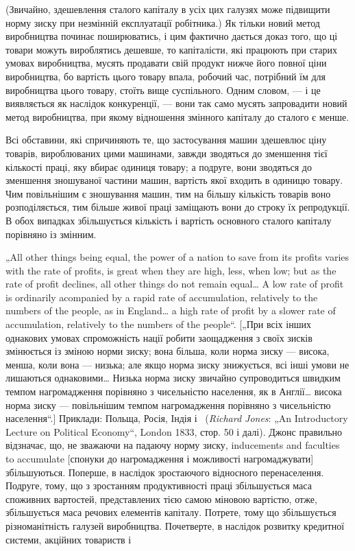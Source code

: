 \parcont{}  %
(Звичайно, здешевлення сталого капіталу в усіх цих галузях
може підвищити норму зиску при незмінній експлуатації робітника.)
Як тільки новий метод виробництва починає поширюватись,
і цим фактично дається доказ того, що ці товари можуть
вироблятись дешевше, то капіталісти, які працюють при старих
умовах виробництва, мусять продавати свій продукт нижче
його повної ціни виробництва, бо вартість цього товару впала,
робочий час, потрібний їм для виробництва цього товару, стоїть
вище суспільного. Одним словом, — і це виявляється як наслідок
конкуренції, — вони так само мусять запровадити новий метод
виробництва, при якому відношення змінного капіталу до
сталого є менше.

Всі обставини, які спричиняють те, що застосування машин
здешевлює ціну товарів, вироблюваних цими машинами,
завжди зводяться до зменшення тієї кількості праці, яку вбирає
одиниця товару; а подруге, вони зводяться до зменшення
зношуваної частини машин, вартість якої входить в одиницю
товару. Чим повільнішим є зношування машин, тим на більшу
кількість товарів воно розподіляється, тим більше живої праці
заміщають вони до строку їх репродукції. В обох випадках
збільшується кількість і вартість основного сталого капіталу
порівняно із змінним.

„All other things being equal, the power of a nation to save from
its profits varies with the rate of profits, is great when they are high,
less, when low; but as the rate of profit declines, all other things do
not remain equal\dots{} A low rate of profit is ordinarily acompanied by
a rapid rate of accumulation, relatively to the numbers of the people,
as in England\dots{} a high rate of profit by a slower rate of accumulation,
relatively to the numbers of the people“. [„При всіх інших
однакових умовах спроможність нації робити заощадження з своїх
зисків змінюється із зміною норми зиску; вона більша, коли
норма зиску — висока, менша, коли вона — низька; але якщо
норма зиску знижується, всі інші умови не лишаються однаковими\dots{}
Низька норма зиску звичайно супроводиться швидким
темпом нагромадження порівняно з чисельністю населення,
як в Англії\dots{} висока норма зиску — повільнішим темпом нагромадження
порівняно з чисельністю населення“.] Приклади: Польща,
Росія, Індія і~ (\emph{Richard Jones}: „An Introductory Lecture on Political
Economy“, London 1833, стор. 50 і далі). Джонс правильно відзначає,
що, не зважаючи на падаючу норму зиску, inducements
and faculties to accumulate [спонуки до нагромадження і можливості
нагромаджувати] збільшуються. Поперше, в наслідок зростаючого
відносного перенаселення. Подруге, тому, що з зростанням
продуктивності праці збільшується маса споживних вартостей,
представлених тією самою міновою вартістю, отже, збільшується
маса речових елементів капіталу. Потрете, тому що
збільшується різноманітність галузей виробництва. Почетверте,
в наслідок розвитку кредитної системи, акційних товариств і~
\parbreak{}  %
